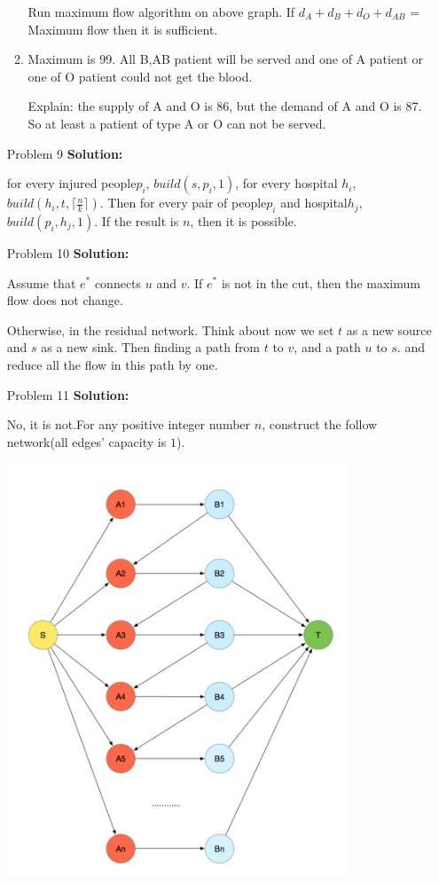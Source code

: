 \normalfont\documentclass[letterpaper,11pt]{article}
\begin{document}
\begin{enumerate}
\begin{enumerate}
	Run maximum flow algorithm on above graph. If $d_A+d_B+d_O+d_{AB}$ = Maximum flow then it is sufficient.
	\item
		Maximum is 99. All B,AB patient will be served and one of A patient or one of O patient could not get the blood.\par
		Explain:
		the supply of A and O is 86, but the demand of A and O is 87. So at least a patient of type A or O can not be served.
	\end{enumerate}
\item [Problem 9]\textbf{Solution:}\par
	for every injured people$p_i$, $build(s,p_i,1)$, for every hospital $h_i$, $build(h_i,t,\lceil \frac{n}{k}\rceil)$. Then for every pair of people$p_i$ and hospital$h_j$, $build(p_i,h_j,1)$.
	If the result is $n$, then it is possible.
\item [Problem 10]\textbf{Solution:}\par
	Assume that $e^*$ connects $u$ and $v$. 
	If $e^*$ is not in the cut, then the maximum flow does not change.\par
	Otherwise, in the residual network. Think about now we set $t$ as a new source and $s$ as a new sink. Then finding a path from $t$ to $v$, and a path $u$ to $s$. and reduce all the flow in this path by one.
\item [Problem 11]\textbf{Solution:}\par
	No, it is not.For any positive integer number $n$, construct the follow network(all edges' capacity is $1$).\par
	\includegraphics[width = 4in]{2.jpeg}\par

\end{enumerate}
\end{document}
